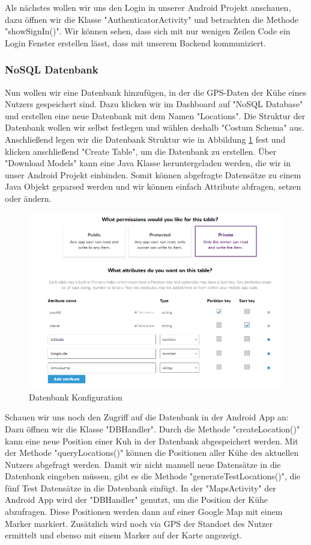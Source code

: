 Als nächstes wollen wir uns den Login in unserer Android Projekt anschauen, dazu öffnen wir die Klasse "AuthenticatorActivity" und betrachten die Methode "showSignIn()". Wir können sehen, dass sich mit nur wenigen Zeilen Code ein Login Fenster erstellen lässt, dass mit unserem Backend kommuniziert.

\subsubsection{NoSQL Datenbank}
Nun wollen wir eine Datenbank hinzufügen, in der die GPS-Daten der Kühe eines Nutzers gespeichert sind. Dazu klicken wir im Dashboard auf "NoSQL Database" und erstellen eine neue Datenbank mit dem Namen "Locations". Die Struktur der Datenbank wollen wir selbst festlegen und wählen deshalb "Costum Schema" aus. Anschließend legen wir die Datenbank Struktur wie in Abbildung \ref{fig:nosqldatabasesetup} fest und klicken anschließend "Create Table", um die Datenbank zu erstellen. Über "Download Models" kann eine Java Klasse heruntergeladen werden, die wir in unser Android Projekt einbinden. Somit können abgefragte Datensätze zu einem Java Objekt geparsed werden und wir können einfach Attribute abfragen, setzen oder ändern.

\begin{figure}[h!]
	\centering
	\includegraphics[width=1\linewidth]{Pictures/NoSQLDatabaseSetup}
	\caption[Datenbank Konfiguration]{Datenbank Konfiguration}
	\label{fig:nosqldatabasesetup}
\end{figure}

Schauen wir uns noch den Zugriff auf die Datenbank in der Android App an: Dazu öffnen wir die Klasse "DBHandler". Durch die Methode "createLocation()" kann eine neue Position einer Kuh in der Datenbank abgespeichert werden. Mit der Methode "queryLocations()" können die Positionen aller Kühe des aktuellen Nutzers abgefragt werden. Damit wir nicht manuell neue Datensätze in die Datenbank eingeben müssen, gibt es die Methode "generateTestLocations()", die fünf Test Datensätze in die Datenbank einfügt. In der "MapsActivity" der Android App wird der "DBHandler" genutzt, um die Position der Kühe abzufragen. Diese Positionen werden dann auf einer Google Map mit einem Marker markiert. Zusätzlich wird noch via GPS der Standort des Nutzer ermittelt und ebenso mit einem Marker auf der Karte angezeigt. 


